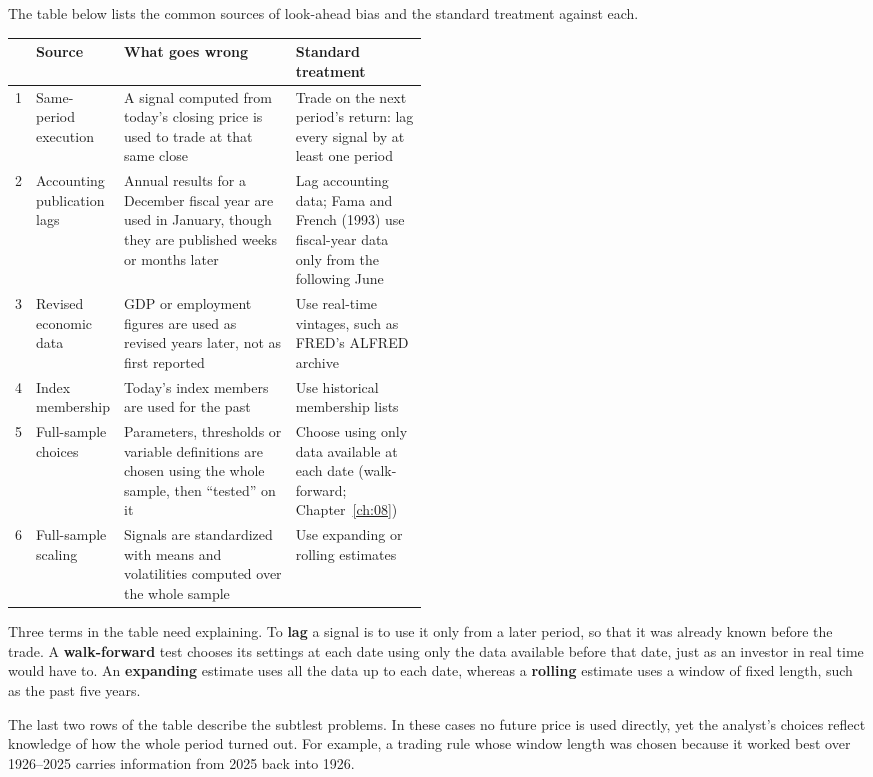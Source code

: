 The table below lists the common sources of look-ahead bias and the standard treatment against each.

\begin{center}
\small
\begin{tabularx}{0.9\linewidth}{@{}r>{\raggedright\arraybackslash}p{0.16\linewidth}>{\raggedright\arraybackslash}X>{\raggedright\arraybackslash}p{0.32\linewidth}@{}}
\toprule
 & Source & What goes wrong & Standard treatment \\
\midrule
1 & Same-period execution & A signal computed from today's closing price is used to trade at that same close & Trade on the next period's return: lag every signal by at least one period \\
2 & Accounting publication lags & Annual results for a December fiscal year are used in January, though they are published weeks or months later & Lag accounting data; Fama and French (1993) use fiscal-year data only from the following June \\
3 & Revised economic data & GDP or employment figures are used as revised years later, not as first reported & Use real-time vintages, such as FRED's ALFRED archive \\
4 & Index membership & Today's index members are used for the past & Use historical membership lists \\
5 & Full-sample choices & Parameters, thresholds or variable definitions are chosen using the whole sample, then ``tested'' on it & Choose using only data available at each date (walk-forward; Chapter~\ref{ch:08}) \\
6 & Full-sample scaling & Signals are standardized with means and volatilities computed over the whole sample & Use expanding or rolling estimates \\
\bottomrule
\end{tabularx}
\end{center}


Three terms in the table need explaining. To \textbf{lag} a signal is to use it only from a later period, so that it was already known before the trade. A \textbf{walk-forward} test chooses its settings at each date using only the data available before that date, just as an investor in real time would have to. An \textbf{expanding} estimate uses all the data up to each date, whereas a \textbf{rolling} estimate uses a window of fixed length, such as the past five years.

The last two rows of the table describe the subtlest problems. In these cases no future price is used directly, yet the analyst's choices reflect knowledge of how the whole period turned out. For example, a trading rule whose window length was chosen because it worked best over 1926--2025 carries information from 2025 back into 1926.

